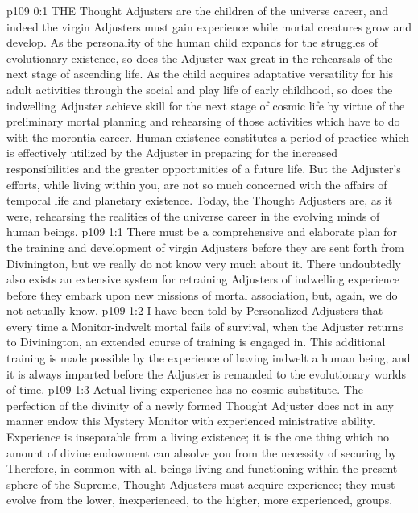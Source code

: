\vs p109 0:1 THE Thought Adjusters are the children of the universe career, and indeed the virgin Adjusters must gain experience while mortal creatures grow and develop. As the personality of the human child expands for the struggles of evolutionary existence, so does the Adjuster wax great in the rehearsals of the next stage of ascending life. As the child acquires adaptative versatility for his adult activities through the social and play life of early childhood, so does the indwelling Adjuster achieve skill for the next stage of cosmic life by virtue of the preliminary mortal planning and rehearsing of those activities which have to do with the morontia career. Human existence constitutes a period of practice which is effectively utilized by the Adjuster in preparing for the increased responsibilities and the greater opportunities of a future life. But the Adjuster’s efforts, while living within you, are not so much concerned with the affairs of temporal life and planetary existence. Today, the Thought Adjusters are, as it were, rehearsing the realities of the universe career in the evolving minds of human beings.
\vs p109 1:1 There must be a comprehensive and elaborate plan for the training and development of virgin Adjusters before they are sent forth from Divinington, but we really do not know very much about it. There undoubtedly also exists an extensive system for retraining Adjusters of indwelling experience before they embark upon new missions of mortal association, but, again, we do not actually know.
\vs p109 1:2 I have been told by Personalized Adjusters that every time a Monitor\hyp{}indwelt mortal fails of survival, when the Adjuster returns to Divinington, an extended course of training is engaged in. This additional training is made possible by the experience of having indwelt a human being, and it is always imparted before the Adjuster is remanded to the evolutionary worlds of time.
\vs p109 1:3 Actual living experience has no cosmic substitute. The perfection of the divinity of a newly formed Thought Adjuster does not in any manner endow this Mystery Monitor with experienced ministrative ability. Experience is inseparable from a living existence; it is the one thing which no amount of divine endowment can absolve you from the necessity of securing by  Therefore, in common with all beings living and functioning within the present sphere of the Supreme, Thought Adjusters must acquire experience; they must evolve from the lower, inexperienced, to the higher, more experienced, groups.
